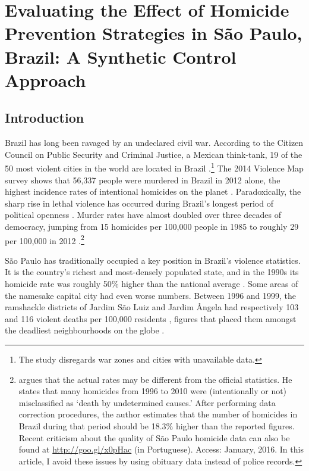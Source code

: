 \chapter{Evaluating the Effect of Homicide Prevention Strategies in São Paulo, Brazil: A Synthetic Control Approach}
\label{chap:synth}

\section{Introduction}

Brazil has long been ravaged by an undeclared civil war. According to the Citizen Council on Public Security and Criminal Justice, a Mexican think-tank, 19 of the 50 most violent cities in the world are located in Brazil \citep{mexico2014}.\footnote{The study disregards war zones and cities with unavailable data.} The 2014 Violence Map survey shows that 56,337 people were murdered in Brazil in 2012 alone, the highest incidence rates of intentional homicides on the planet \citep{mapa2014, unodc2013}. Paradoxically, the sharp rise in lethal violence has occurred during Brazil's longest period of political openness \citep{ahnen2003, pinheiro2000, pinheiro2001}. Murder rates have almost doubled over three decades of democracy, jumping from 15 homicides per 100,000 people in 1985 to roughly 29 per 100,000 in 2012 \citep{mapa2014}.\footnote{\citet{cerqueira2013} argues that the actual rates may be different from the official statistics. He states that many homicides from 1996 to 2010 were (intentionally or not) misclassified as `death by undetermined causes.' After performing data correction procedures, the author estimates that the number of homicides in Brazil during that period should be 18.3\% higher than the reported figures. Recent criticism about the quality of São Paulo homicide data can also be found at \url{http://goo.gl/x0pHac} (in Portuguese). Access: January, 2016. In this article, I avoid these issues by using obituary data instead of police records.}

São Paulo has traditionally occupied a key position in Brazil's violence statistics. It is the country's richest and most-densely populated state, and in the 1990s its homicide rate was roughly 50\% higher than the national average \citep[p. 120]{barata2000}. Some areas of the namesake capital city had even worse numbers. Between 1996 and 1999, the ramshackle districts of Jardim São Luiz and Jardim Ângela had respectively 103 and 116 violent deaths per 100,000 residents \citep[p. 8]{cardia2003}, figures that placed them amongst the deadliest neighbourhoods on the globe \citep{who2015}.

